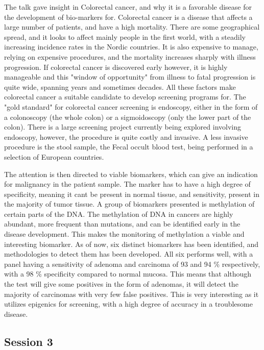 \documentclass[12p]{article}
\begin{document}
The talk gave insight in Colorectal cancer, and why it is a favorable disease for the development of bio-markers for.
Colorectal cancer is a disease that affects a large number of patients, and have a high mortality.
There are some geographical spread, and it looks to affect mainly people in the first world, with a steadily increasing incidence rates in the Nordic countries.
It is also expensive to manage, relying on expensive procedures, and the mortality increases sharply with illness progression.
If colorectal cancer is discovered early however, it is highly manageable and this "window of opportunity" from illness to fatal progression is quite wide, spanning years and sometimes decades.
All these factors make colorectal cancer a suitable candidate to develop screening programs for.
The "gold standard" for colorectal cancer screening is endoscopy, either in the form of a colonoscopy (the whole colon) or a sigmoidoscopy (only the lower part of the colon).
There is a large screening project currently being explored involving endoscopy, however, the procedure is quite costly and invasive.
A less invasive procedure is the stool sample, the Fecal occult blood test, being performed in a selection of European countries.

The attention is then directed to viable biomarkers, which can give an indication for malignancy in the patient sample.
The marker has to have a high degree of specificity, meaning it cant be present in normal tissue, and sensitivity, present in the majority of tumor tissue.
A group of biomarkers presented is methylation of certain parts of the DNA.
The methylation of DNA in cancers are highly abundant, more frequent than mutations, and can be identified early in the disease development.
This makes the monitoring of methylation a viable and interesting biomarker.
As of now, six distinct biomarkers has been identified, and methodologies to detect them has been developed.
All six performs well, with a panel having a sensitivity of adenoma and carcinoma of 93 and 94 \% respectively, with a 98 \% specificity compared to normal mucosa.
This means that although the test will give some positives in the form of adenomas, it will detect the majority of carcinomas with very few false positives.
This is very interesting as it utilizes epigenics for screening, with a high degree of accuracy in a troublesome disease.

\subsection*{Session 3}
\end{document}
